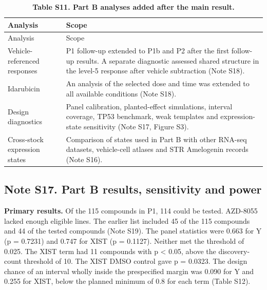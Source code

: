 \documentclass[
  11pt,
  letterpaper,
]{article}
\begin{document}
\begin{longtable}[]{@{}
  >{\raggedright\arraybackslash}p{}
  >{\raggedright\arraybackslash}p{}@{}}
\caption{\textbf{Table S11. Part B analyses added after the main
result.}}\tabularnewline
\toprule\noalign{}
\begin{minipage}[b]{\linewidth}\raggedright
Analysis
\end{minipage} & \begin{minipage}[b]{\linewidth}\raggedright
Scope
\end{minipage} \\
\midrule\noalign{}
\endfirsthead
\toprule\noalign{}
\begin{minipage}[b]{\linewidth}\raggedright
Analysis
\end{minipage} & \begin{minipage}[b]{\linewidth}\raggedright
Scope
\end{minipage} \\
\midrule\noalign{}
\endhead
\bottomrule\noalign{}
\endlastfoot
Vehicle-referenced responses & P1 follow-up extended to P1b and P2 after
the first follow-up results. A separate diagnostic assessed shared
structure in the level-5 response after vehicle subtraction (Note
S18). \\
Idarubicin & An analysis of the selected dose and time was extended to
all available conditions (Note S18). \\
Design diagnostics & Panel calibration, planted-effect simulations,
interval coverage, TP53 benchmark, weak templates and expression-state
sensitivity (Note S17, Figure S3). \\
Cross-stock expression states & Comparison of states used in Part B with
other RNA-seq datasets, vehicle-cell atlases and STR Amelogenin records
(Note S16). \\
\end{longtable}

\subsection{Note S17. Part B results, sensitivity and
power}\label{note-s17.-part-b-results-sensitivity-and-power}

\textbf{Primary results.} Of the 115 compounds in P1, 114 could be
tested. AZD-8055 lacked enough eligible lines. The earlier list included
45 of the 115 compounds and 44 of the tested compounds (Note S19). The
panel statistics were 0.663 for Y (p = 0.7231) and 0.747 for XIST (p =
0.1127). Neither met the threshold of 0.025. The XIST term had 11
compounds with p \textless{} 0.05, above the discovery-count threshold
of 10. The XIST DMSO control gave p = 0.0323. The design chance of an
interval wholly inside the prespecified margin was 0.090 for Y and 0.255
for XIST, below the planned minimum of 0.8 for each term (Table S12).
\end{document}
